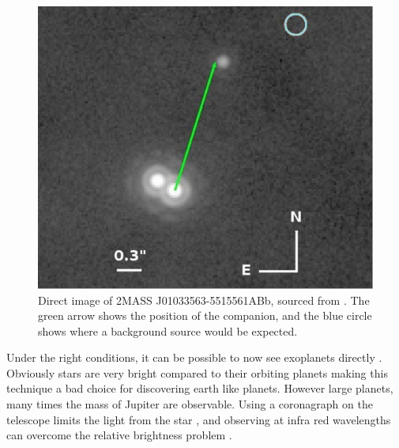 \begin{figure}
    \centering
    \includegraphics[width=\columnwidth]{images/direct_image.png}
    \caption{Direct image of 2MASS J01033563-5515561ABb, sourced from \cite{delorme2013direct}. The green arrow shows the position of the companion, and the blue circle shows where a background source would be expected.}
    \label{fig:direct}
\end{figure}

Under the right conditions, it can be possible to now see exoplanets directly \citep{lafreniere2010directly,kuzuhara2013direct,delorme2013direct}. Obviously stars are very bright compared to their orbiting planets making this technique a bad choice for discovering earth like planets. However large planets, many times the mass of Jupiter are observable. Using a coronagraph on the telescope limits the light from the star \citep{kuchner2002coronagraph}, and observing at infra red wavelengths can overcome the relative brightness problem \citep{delorme2013direct}.
